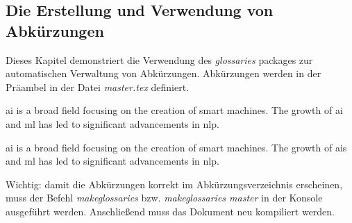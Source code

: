 
\subsection{Die Erstellung und Verwendung von Abkürzungen} \label{chap:abbreviations}
Dieses Kapitel demonstriert die Verwendung des \emph{glossaries} packages zur automatischen Verwaltung von Abkürzungen. Abkürzungen werden in der Präambel in der Datei \emph{master.tex} definiert.

\gls{ai} is a broad field focusing on the creation of smart machines. The growth of \gls{ai} and \gls{ml} has led to significant advancements in \gls{nlp}.

\gls{ai} is a broad field focusing on the creation of smart machines. The growth of \glspl{ai} and \gls{ml} has led to significant advancements in \gls{nlp}.


Wichtig: damit die Abkürzungen korrekt im Abkürzungsverzeichnis erscheinen, muss der Befehl \emph{makeglossaries} bzw. \emph{makeglossaries master} in der Konsole ausgeführt werden. Anschließend muss das Dokument neu kompiliert werden.
